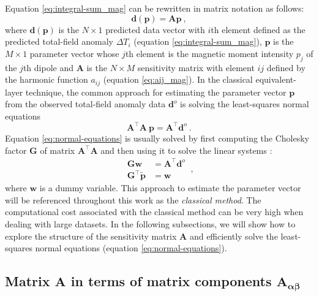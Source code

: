 \documentclass[manuscript]{geophysics}
\begin{document}
	Equation \ref{eq:integral-sum_mag} can be rewritten in matrix notation as follows:
	\begin{equation}
		\mathbf{d}(\mathbf{p}) = \mathbf{A} \mathbf{p} \: ,
		\label{eq:predicted-data-vector_mag}
	\end{equation}
	where $\mathbf{d}(\mathbf{p})$ is the $N \times 1$ predicted data vector with $i$th element defined
	as the predicted total-field anomaly $\Delta T_{i}$ (equation \ref{eq:integral-sum_mag}),
	$\mathbf{p}$ is the $M \times 1$ parameter vector whose $j$th element is the magnetic moment intensity
	$p_{j}$ of the $j$th dipole and $\mathbf{A}$ is the $N \times M$ sensitivity matrix with element 
	$ij$ defined by the harmonic function $a_{ij}$ (equation \ref{eq:aij_mag}).
	In the classical equivalent-layer technique, the common approach for 
	estimating the parameter vector $\mathbf{p}$ from the observed 
	total-field anomaly data $\mathbf{d}^{o}$ is solving the least-squares normal equations
	\begin{equation}
		\mathbf{A}^{\top}\mathbf{A} \: \mathbf{p} = 
		\mathbf{A}^{\top} \mathbf{d}^{o} \: .
		\label{eq:normal-equations}
	\end{equation}
	Equation \ref{eq:normal-equations} is usually solved by first computing the Cholesky 
	factor $\mathbf{G}$ of matrix $\mathbf{A}^{\top}\mathbf{A}$ and then using it to solve the linear 
	systems \citep[][ p. 262]{golub-vanloan2013}:
	\begin{equation}
		\begin{split}
			\mathbf{G} \mathbf{w} &= \mathbf{A}^{\top}\mathbf{d}^{o} \\
			\mathbf{G}^{\top} \tilde{\mathbf{p}} &= \mathbf{w}
		\end{split} \: ,
		\label{eq:classical-method}
	\end{equation}
	where $\mathbf{w}$ is a dummy variable.
	This approach to estimate the parameter vector will be 
	referenced throughout this work as the \textit{classical method}.
	The computational cost associated with the classical method can be very high
	when dealing with large datasets. In the following subsections, we will show how to 
	explore the structure of the sensitivity matrix $\mathbf{A}$ and 
	efficiently solve the least-squares normal equations (equation \ref{eq:normal-equations}).
	
	
	\subsection{Matrix $\mathbf{A}$ in terms of matrix components $\mathbf{A_{\boldsymbol{\alpha\beta}}}$}
	
\end{document}
